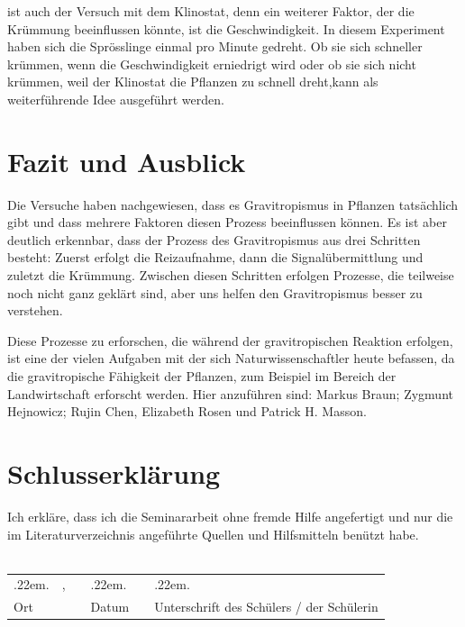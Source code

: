 \documentclass[
11pt, 
ngerman,
listof=totocnumbered,
oneside,
bibliography=totocnumbered,
abstracton
]{scrreprt}
\makeatletter
\newcommand \Dotfill {\leavevmode \cleaders \hb@xt@ .22em{\hss .\hss }\hfill \kern \z@}
\makeatother
\begin{document}
  ist auch der Versuch mit dem Klinostat, denn ein weiterer Faktor, der die Krümmung beeinflussen könnte, ist die Geschwindigkeit. In diesem Experiment haben sich die Sprösslinge einmal pro Minute gedreht. Ob sie sich schneller krümmen, wenn die Geschwindigkeit erniedrigt wird oder ob sie sich nicht krümmen, weil der Klinostat die Pflanzen zu schnell dreht,kann als weiterführende Idee ausgeführt werden.


\chapter{Fazit und Ausblick}

Die Versuche haben nachgewiesen, dass es Gravitropismus in Pflanzen tatsächlich gibt und dass mehrere Faktoren diesen Prozess beeinflussen können. Es ist aber deutlich erkennbar, dass der Prozess des Gravitropismus aus drei Schritten besteht: Zuerst erfolgt die Reizaufnahme, dann die Signalübermittlung und zuletzt die Krümmung. Zwischen diesen Schritten erfolgen Prozesse, die teilweise noch nicht ganz geklärt sind, aber uns helfen den Gravitropismus besser zu verstehen. 

Diese Prozesse zu erforschen, die während der gravitropischen Reaktion erfolgen, ist eine der vielen Aufgaben mit der sich Naturwissenschaftler  heute befassen, da die gravitropische Fähigkeit der Pflanzen, zum Beispiel im Bereich der Landwirtschaft erforscht werden\parencite[343]{Chen1999}.
Hier anzuführen sind: Markus Braun; Zygmunt Hejnowicz; Rujin Chen, Elizabeth Rosen und Patrick H. Masson.


\printbibliography

\listoffigures

\chapter {Schlusserklärung}

Ich erkläre, dass ich die Seminararbeit ohne fremde Hilfe angefertigt und nur die im Literaturverzeichnis angeführte Quellen und Hilfsmitteln benützt habe.
\\
\\

\setlength\tabcolsep{0pt}\noindent\begin{tabular}{p{} p{} p{} p{} p{} p{}}
	\Dotfill & \hfill, & & \Dotfill &  & \Dotfill \\ 
	Ort & & & Datum &  & Unterschrift des Schülers / der Schülerin \\
\end{tabular}
\end{document}
